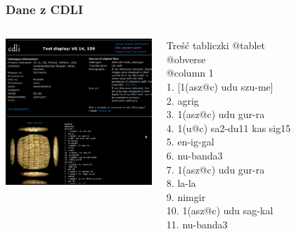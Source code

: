 \begin{frame}
\frametitle{Dane z CDLI}
\begin{columns}
 \includegraphics[width=55mm]{../diagramy/cdli.pdf}      
\begin{block}{Treść tabliczki}
@tablet \\
@obverse \\
@column 1 \\
1. [1(asz@c) udu szu-me] \\
2. agrig \\
3. 1(asz@c) udu gur-ra \\
4. 1(u@c) sa2-du11 kas sig15 \\
5. en-ig-gal \\
6. nu-banda3 \\
7. 1(asz@c) udu gur-ra \\
8. la-la \\
9. nimgir \\
10. 1(asz@c) udu sag-kal \\
11. nu-banda3 \\

\end{block}
\end{columns}
\end{frame}
